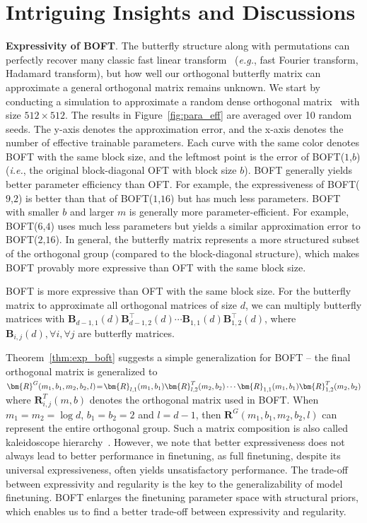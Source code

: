\section{Intriguing Insights and Discussions}

\textbf{Expressivity of BOFT}. The butterfly structure along with permutations can perfectly recover many classic fast linear transform~\cite{dao2019learning,dao2019kaleidoscope} (\emph{e.g.}, fast Fourier transform, Hadamard transform), but how well our orthogonal butterfly matrix can approximate a general orthogonal matrix remains unknown. We start by conducting a simulation to approximate a random dense orthogonal matrix~\cite{anderson1987generation} with size $512\times 512$. The results in Figure~\ref{fig:para_eff} are averaged over 10 random seeds. The y-axis denotes the approximation error, and the x-axis denotes the number of effective trainable parameters. Each curve with the same color denotes BOFT with the same block size, and the leftmost point is the error of BOFT($1$,$b$) (\emph{i.e.}, the original block-diagonal OFT with block size $b$). BOFT generally yields better parameter efficiency than OFT. For example, the expressiveness of BOFT($9$,$2$) is better than that of BOFT($1$,$16$) but has much less parameters. BOFT with smaller $b$ and larger $m$ is generally more parameter-efficient. For example, BOFT($6$,$4$) uses much less parameters but yields a similar approximation error to BOFT($2$,$16$). In general, the butterfly matrix represents a more structured subset of the orthogonal group (compared to the block-diagonal structure), which makes BOFT provably more expressive than OFT with the same block size.

\begin{theorem}\label{thm:exp_boft}
    BOFT is more expressive than OFT with the same block size. For the butterfly matrix to approximate all orthogonal matrices of size $d$, we can multiply butterfly matrices with  $\bm{B}_{d-1,1}(d)\bm{B}^\top_{d-1,2}(d)\cdots\bm{B}_{1,1}(d)\bm{B}^\top_{1,2}(d)$, where $\bm{B}_{i,j}(d),\forall i,\forall j$ are butterfly matrices.
\end{theorem}

Theorem~\ref{thm:exp_boft} suggests a simple generalization for BOFT -- the final orthogonal matrix is generalized to $\thickmuskip=2mu \medmuskip=2mu \bm{R}^G(m_1,b_1,m_2,b_2,l)=\bm{R}_{l,1}(m_1,b_1)\bm{R}_{l,2}^T(m_2,b_2)\cdots\bm{R}_{1,1}(m_1,b_1)\bm{R}_{1,2}^T(m_2,b_2)$ where $\bm{R}_{i,j}^T(m,b)$ denotes the orthogonal matrix used in BOFT. When $m_1=m_2=\log d$, $b_1=b_2=2$ and $l=d-1$, then $\bm{R}^G(m_1,b_1,m_2,b_2,l)$ can represent the entire orthogonal group. Such a matrix composition is also called kaleidoscope hierarchy~\cite{dao2019kaleidoscope}. However, we note that better expressiveness does not always lead to better performance in finetuning, as full finetuning, despite its universal expressiveness, often yields unsatisfactory performance. The trade-off between expressivity and regularity is the key to the generalizability of model finetuning. BOFT enlarges the finetuning parameter space with structural priors, which enables us to find a better trade-off between expressivity and regularity.

